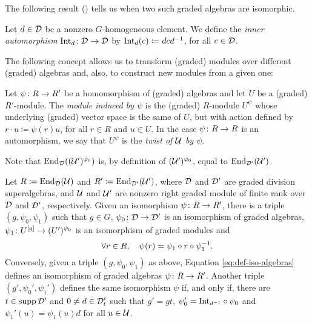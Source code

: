 The following result (\cite[Theorem 2.10]{livromicha}) tells us when two such graded algebras are isomorphic.

\begin{defi}\label{def:inner-automorphism}
	Let $d\in \mathcal{D}$ be a nonzero $G$-homogeneous element.
	We define the \emph{inner automorphism} $\operatorname{Int}_d\colon \mathcal{D} \to \mathcal{D}$ by $\operatorname{Int}_d (c) \coloneqq dcd^{-1}$, for all $c\in \mathcal{D}$.
\end{defi}

The following concept allows us to transform (graded) modules over different (graded) algebras and, also, to construct new modules from a given one:

\begin{defi}\label{def:twist}
	Let $\psi\colon R \to R'$ be a homomorphism of (graded) algebras and let $U$ be a (graded) $R' $-module.
	The \emph{module induced by $\psi$} is the (graded) $R$-module $U^{\psi}$ whose underlying (graded) vector space is the same of $U$, but with action defined by $r \cdot u \coloneqq \psi(r)u$, for all $r\in R$ and $u\in U$.
	In the case $\psi\colon R \to R$ is an automorphism, we say that $U^{\psi}$ is the \emph{twist of $\mathcal U$ by $\psi$}.
\end{defi}

\begin{remark}
	Note that $\operatorname{End}_{\mathcal{D}} ( (\mathcal U')^{\varphi_0})$ is, by definition of $(\mathcal U')^{\varphi_0}$, equal to $\operatorname{End}_{\mathcal{D}'} ( \mathcal U')$.
\end{remark}

\begin{thm}\label{thm:iso-abstract}
	Let $R \coloneqq \operatorname{End}_{\mathcal{D}}(\mathcal U)$ and $R' \coloneqq \operatorname{End}_{\mathcal{D}'}(\mathcal U')$, where $\mathcal{D}$ and $\mathcal{D}'$ are graded division superalgebras, and $\mathcal U$ and $\mathcal U'$ are nonzero right graded module of finite rank over $\mathcal{D}$ and $\mathcal{D}'$, respectively.
	Given an isomorphism $\psi\colon R \to R'$, there is a triple $(g, \psi_0, \psi_1)$ such that $g \in G$, $\psi_0\colon \mathcal{D} \to \mathcal{D}'$ is an isomorphism of graded algebras, $\psi_1\colon U^{[g]} \to (U')^{\psi_0}$ is an isomorphism of graded modules and
	\begin{equation}\label{eq:def-iso-algebras}
		\forall r\in R, \quad \psi(r) = \psi_1 \circ r \circ \psi_1^{-1}.
	\end{equation}
	Conversely, given a triple $(g, \psi_0, \psi_1)$ as above, Equation \eqref{eq:def-iso-algebras} defines an isomorphism of graded algebras $\psi\colon R \to R'$.
	Another triple $(g', \psi_0', \psi_1')$ defines the same isomorphism $\psi$ if, and only if, there are $t\in \operatorname{supp} \mathcal{D}'$ and $0 \neq d\in \mathcal{D}'_t$ such that $g'= gt$, $\psi_0' = \mathrm{Int}_{d^{-1}} \circ \psi_0$ and $\psi_1' (u) = \psi_1 (u) d$ for all $u \in \mathcal U$.
\end{thm}


